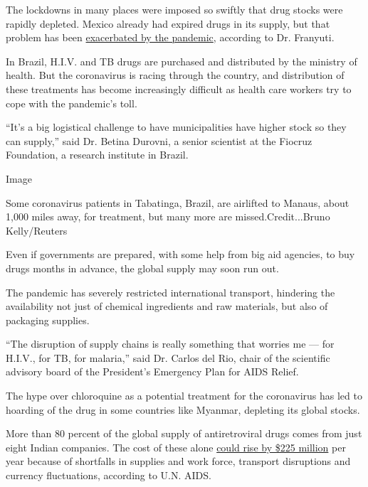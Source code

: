 The lockdowns in many places were imposed so swiftly that drug stocks
were rapidly depleted. Mexico already had expired drugs in its supply,
but that problem has been
\href{https://www.reuters.com/article/us-health-coronavirus-lgbt-aids/no-medicine-no-food-coronavirus-restrictions-amplify-health-risks-to-lgbt-people-with-hiv-idUSKBN22W28G}{exacerbated
by the pandemic}, according to Dr. Franyuti.

In Brazil, H.I.V. and TB drugs are purchased and distributed by the
ministry of health. But the coronavirus is racing through the country,
and distribution of these treatments has become increasingly difficult
as health care workers try to cope with the pandemic's toll.

``It's a big logistical challenge to have municipalities have higher
stock so they can supply,'' said Dr. Betina Durovni, a senior scientist
at the Fiocruz Foundation, a research institute in Brazil.

Image

Some coronavirus patients in Tabatinga, Brazil, are airlifted to Manaus,
about 1,000 miles away, for treatment, but many more are
missed.Credit...Bruno Kelly/Reuters

Even if governments are prepared, with some help from big aid agencies,
to buy drugs months in advance, the global supply may soon run out.

The pandemic has severely restricted international transport, hindering
the availability not just of chemical ingredients and raw materials, but
also of packaging supplies.

``The disruption of supply chains is really something that worries me
--- for H.I.V., for TB, for malaria,'' said Dr. Carlos del Rio, chair of
the scientific advisory board of the President's Emergency Plan for AIDS
Relief.

The hype over chloroquine as a potential treatment for the coronavirus
has led to hoarding of the drug in some countries like Myanmar,
depleting its global stocks.

More than 80 percent of the global supply of antiretroviral drugs comes
from just eight Indian companies. The cost of these alone
\href{https://www.unaids.org/en/resources/presscentre/pressreleaseandstatementarchive/2020/june/20200622_availability-and-cost-of-antiretroviral-medicines}{could
rise by \$225 million} per year because of shortfalls in supplies and
work force, transport disruptions and currency fluctuations, according
to U.N. AIDS.

